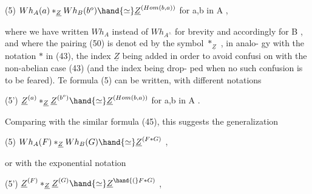 (5) \qquad $Wh_A(a) *_{\underline{Z}} Wh_B(b^o) \hand{\simeq} \underline{Z}^{(Hom(b,a))}$ \qquad for a,b in A ,

where we have written $Wh_A$ instead of $Wh_{A^{\wedge}}$ for brevity and accordingly for
B , and where the pairing (50) is denot ed by the symbol $*_{\underline{Z}}$ , in analo-%
gy with the notation $*$ in (43), the index $\underline{Z}$ being added in order to
avoid confusi on with the non-abelian case (43) (and the index being drop-%
ped when no such confusion is to be feared). Te formula (5) can be
written, with different notations

(5') \qquad $\underline{Z}^{(a)} *_{\underline{Z}} \underline{Z}^{(b^o)} \hand{\simeq} \underline{Z}^{(Hom(b,a))}$ \qquad for a,b in A .

Comparing with the similar formula (45), this suggests the generalization

(5) \qquad $Wh_A(F) *_{\underline{Z}} Wh_B(G) \hand{\simeq} \underline{Z}^{(F*G)}$ \qquad ,

or with the exponential notation

(5') \qquad $\underline{Z}^{(F)} *_{\underline{Z}} \underline{Z}^{(G)} \hand{\simeq} \underline{Z}^{\hand{(}F*G)}$ \qquad ,

